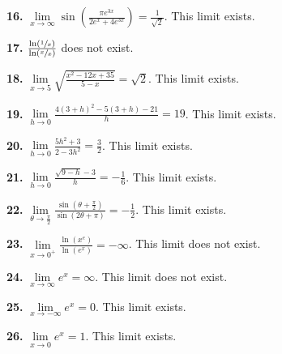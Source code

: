 \documentclass[12pt,]{book}
\theoremstyle{plain}
\theoremstyle{definition}
\numberwithin{equation}{section}
\newcommand{\fe}[2]{#1\mathopen{}\left(#2\right)\mathclose{}}
\begin{document}
                \par\smallskip
\noindent\textbf{16.}\quad{}
                    \(\lim\limits_{x\to\infty}\fe{\sin}{\frac{\pi e^{3x}}{2e^x+4e^{3x}}}=\frac{1}{\sqrt{2}}\). This limit exists.%

                \par\smallskip
\noindent\textbf{17.}\quad{}
                    \(\frac{\fe{\ln}{\sfrac{1}{x}}}{\fe{\ln}{\sfrac{x}{x}}}\) does not exist.%

                \par\smallskip
\noindent\textbf{18.}\quad{}
                    \(\lim\limits_{x\to5}\sqrt{\frac{x^2-12x+35}{5-x}}=\sqrt{2}\). This limit exists.%

                \par\smallskip
\noindent\textbf{19.}\quad{}
                    \(\lim\limits_{h\to0}\frac{4(3+h)^2-5(3+h)-21}{h}=19\). This limit exists.%

                \par\smallskip
\noindent\textbf{20.}\quad{}
                    \(\lim\limits_{h\to0}\frac{5h^2+3}{2-3h^2}=\frac{3}{2}\). This limit exists.%

                \par\smallskip
\noindent\textbf{21.}\quad{}
                    \(\lim\limits_{h\to0}\frac{\sqrt{9-h}-3}{h}=-\frac{1}{6}\). This limit exists.%

                \par\smallskip
\noindent\textbf{22.}\quad{}
                    \(\lim\limits_{\theta\to\frac{\pi}{2}}\frac{\fe{\sin}{\theta+\frac{\pi}{2}}}{\fe{\sin}{2\theta+\pi}}=-\frac{1}{2}\). This limit exists.%

                \par\smallskip
\noindent\textbf{23.}\quad{}
                    \(\lim\limits_{x\to0^{+}}\frac{\fe{\ln}{x^e}}{\fe{\ln}{e^x}}=-\infty\). This limit does not exist.%

                \par\smallskip
\noindent\textbf{24.}\quad{}
                    \(\lim\limits_{x\to\infty}e^x=\infty\). This limit does not exist.%

                \par\smallskip
\noindent\textbf{25.}\quad{}
                    \(\lim\limits_{x\to-\infty}e^x=0\). This limit exists.%

                \par\smallskip
\noindent\textbf{26.}\quad{}
                    \(\lim\limits_{x\to0}e^x=1\). This limit exists.%
\end{document}
